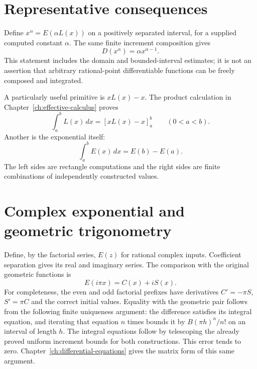 \section{Representative consequences}
Define $x^\alpha=E(\alpha L(x))$ on a positively separated interval,
for a supplied computed constant $\alpha$.  The same finite increment
composition gives
\[
 D(x^\alpha)=\alpha x^{\alpha-1}.
\]
This statement includes the domain and bounded-interval estimates; it is
not an assertion that arbitrary rational-point differentiable functions
can be freely composed and integrated.

A particularly useful primitive is $xL(x)-x$.  The product calculation in
Chapter~\ref{ch:effective-calculus} proves
\[
 \int_a^b L(x)\,dx=[xL(x)-x]_a^b\qquad(0<a<b).
\]
Another is the exponential itself:
\[
 \int_a^b E(x)\,dx=E(b)-E(a).
\]
The left sides are rectangle computations and the right sides are finite
combinations of independently constructed values.

\section{Complex exponential and geometric trigonometry}
Define, by the factorial series, $E(z)$ for rational complex
inputs.  Coefficient separation gives its real and imaginary series.
The comparison with the original geometric functions is
\[
 E(i\pi x)=C(x)+iS(x).
\]
For completeness, the even and odd factorial prefixes have derivatives
$C'=-\pi S$, $S'=\pi C$ and the correct initial values.  Equality with
the geometric pair follows from the following finite uniqueness argument:
the difference satisfies its integral equation, and iterating that
equation $n$ times bounds it by $B(\pi h)^n/n!$ on an interval of length
$h$.  The integral equations follow by telescoping the already proved
uniform increment bounds for both constructions.  This error tends to
zero.  Chapter~\ref{ch:differential-equations} gives the matrix form of
this same argument.



